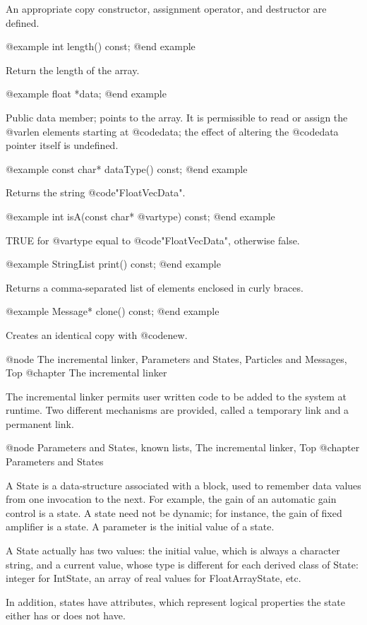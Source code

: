 An appropriate copy constructor, assignment operator, and destructor
are defined.

@example
int length() const;
@end example

Return the length of the array.

@example
float *data;
@end example

Public data member; points to the array.  It is permissible to read or
assign the @var{len} elements starting at @code{data}; the effect of
altering the @code{data} pointer itself is undefined.

@example
const char* dataType() const;
@end example

Returns the string @code{"FloatVecData"}.

@example
int isA(const char* @var{type}) const;
@end example

TRUE for @var{type} equal to @code{"FloatVecData"}, otherwise false.

@example
StringList print() const;
@end example

Returns a comma-separated list of elements enclosed in curly braces.

@example
Message* clone() const;
@end example

Creates an identical copy with @code{new}.

@node The incremental linker, Parameters and States, Particles and Messages, Top
@chapter The incremental linker

The incremental linker permits user written code to be added to the
system at runtime.  Two different mechanisms are provided, called
a temporary link and a permanent link.

@node Parameters and States, known lists, The incremental linker, Top
@chapter Parameters and States

A State is a data-structure associated with a block, used to remember
data values from one invocation to the next.
For example, the gain of an automatic gain control is a state.
A state need not be dynamic; for instance, the gain of fixed
amplifier is a state.  A parameter is the initial value of a state.

A State actually has two values: the initial value, which is always
a character string, and a current value, whose type is different for
each derived class of State: integer for IntState, an array of real
values for FloatArrayState, etc.

In addition, states have attributes, which represent logical properties
the state either has or does not have.


